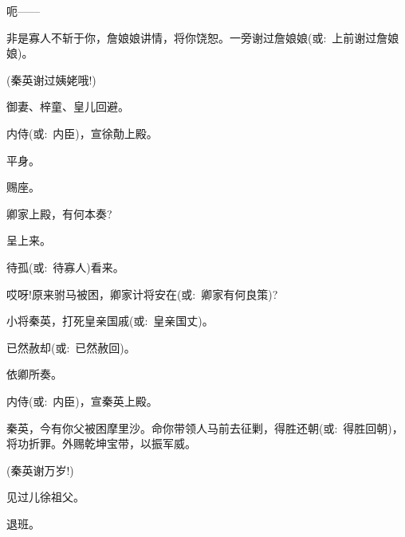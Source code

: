 {

呃------





非是寡人不斩于你，詹娘娘讲情，将你饶恕。一旁谢过詹娘娘({\akai 或}:~上前谢过詹娘娘)。

(秦英\hspace{30pt}谢过姨姥哦!)

御妻、梓童、皇儿回避。

内侍({\akai 或}:~内臣)，宣徐勣上殿。

平身。

赐座。

卿家上殿，有何本奏?

呈上来。

待孤({\akai 或}:~待寡人)看来。

哎呀!原来驸马被困，卿家计将安在({\akai 或}:~卿家有何良策)?

小将秦英，打死皇亲国戚({\akai 或}:~皇亲国丈)。

已然赦却({\akai 或}:~已然赦回)。

依卿所奏。

内侍({\akai 或}:~内臣)，宣秦英上殿。

秦英，今有你父被困摩里沙。命你带领人马前去征剿，得胜还朝({\akai 或}:~得胜回朝)，将功折罪。外赐乾坤宝带，以振军威。

(秦英\hspace{30pt}谢万岁!)

见过儿徐祖父。

退班。

}
